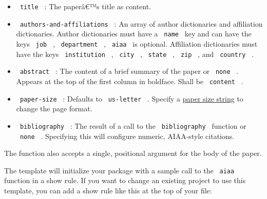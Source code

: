 \begin{itemize}
\tightlist
\item
  \texttt{\ title\ } : The paperâ€™s title as content.
\item
  \texttt{\ authors-and-affiliations\ } : An array of author
  dictionaries and affiliation dictionaries. Author dictionaries must
  have a \texttt{\ name\ } key and can have the keys \texttt{\ job\ } ,
  \texttt{\ department\ } , \texttt{\ aiaa\ } is optional. Affiliation
  dictionaries must have the keys \texttt{\ institution\ } ,
  \texttt{\ city\ } , \texttt{\ state\ } , \texttt{\ zip\ } , and
  \texttt{\ country\ } .
\item
  \texttt{\ abstract\ } : The content of a brief summary of the paper or
  \texttt{\ none\ } . Appears at the top of the first column in
  boldface. Shall be \texttt{\ content\ } .
\item
  \texttt{\ paper-size\ } : Defaults to \texttt{\ us-letter\ } . Specify
  a
  \href{https://typst.app/docs/reference/layout/page/\#parameters-paper}{paper
  size string} to change the page format.
\item
  \texttt{\ bibliography\ } : The result of a call to the
  \texttt{\ bibliography\ } function or \texttt{\ none\ } . Specifying
  this will configure numeric, AIAA-style citations.
\end{itemize}

The function also accepts a single, positional argument for the body of
the paper.

The template will initialize your package with a sample call to the
\texttt{\ aiaa\ } function in a show rule. If you want to change an
existing project to use this template, you can add a show rule like this
at the top of your file:

